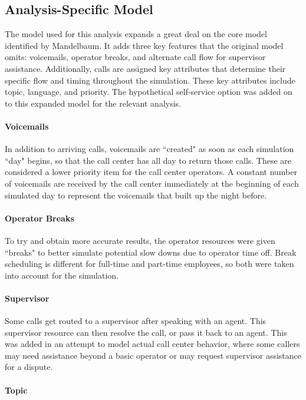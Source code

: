 \documentclass[12pt,twocolumn]{article}
\begin{document}
\subsection{Analysis-Specific Model}
The model used for this analysis expands a great deal on the core model identified by Mandelbaum.  It adds three key features that the original model omits: voicemails, operator breaks, and alternate call flow for supervisor assistance.  Additionally, calls are assigned key attributes that determine their specific flow and timing throughout the simulation.  These key attributes include topic, language, and priority.  The hypothetical self-service option was added on to this expanded model for the relevant analysis.

	\paragraph{Voicemails}
	
In addition to arriving calls, voicemails are ``created" as soon as each simulation ``day" begins, so that the call center has all day to return those calls.  These are considered a lower priority item for the call center operators.  A constant number of voicemails are received by the call center immediately at the beginning of each simulated day to represent the voicemails that built up the night before.

	\paragraph{Operator Breaks}
	
To try and obtain more accurate results, the operator resources were given ``breaks" to better simulate potential slow downs due to operator time off. Break scheduling is different for full-time and part-time employees, so both were taken into account for the simulation.

	\paragraph{Supervisor}
	
Some calls get routed to a supervisor after speaking with an agent.  This supervisor resource can then resolve the call, or pass it back to an agent.  This was added in an attempt to model actual call center behavior, where some callers may need assistance beyond a basic operator or may request supervisor assistance for a dispute. 

	\paragraph{Topic}
\end{document}
